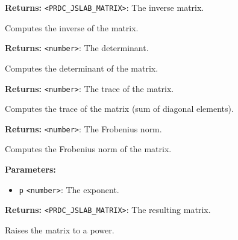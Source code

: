 \documentclass[12pt,a4paper]{article}
\begin{document}
\noindent \textbf{Returns:} \texttt{<PRDC\_JSLAB\_MATRIX>}: The inverse matrix.

\noindent Computes the inverse of the matrix.

\vspace{5mm}
\noindent {}


\noindent \textbf{Returns:} \texttt{<number>}: The determinant.

\noindent Computes the determinant of the matrix.

\vspace{5mm}
\noindent {}


\noindent \textbf{Returns:} \texttt{<number>}: The trace of the matrix.

\noindent Computes the trace of the matrix (sum of diagonal elements).

\vspace{5mm}
\noindent {}


\noindent \textbf{Returns:} \texttt{<number>}: The Frobenius norm.

\noindent Computes the Frobenius norm of the matrix.

\vspace{5mm}
\noindent {}


\noindent \textbf{Parameters:}
\begin{itemize}
  \item \texttt{p} \texttt{<number>}: The exponent.
\end{itemize}

\noindent \textbf{Returns:} \texttt{<PRDC\_JSLAB\_MATRIX>}: The resulting matrix.

\noindent Raises the matrix to a power.

\vspace{5mm}
\noindent {}
\end{document}
